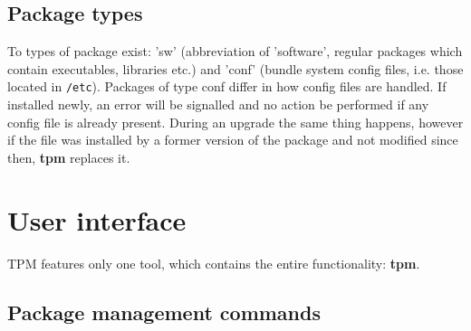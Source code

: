 \documentclass[a4paper]{article}
\newcommand{\file}[1]{\texttt{#1}}
\newcommand{\program}[1]{\textbf{#1}}
\begin{document}
	\subsection{Package types}
	\label{sec:package_types}
	
	To types of package exist: 'sw' (abbreviation of 'software', regular packages which contain executables, libraries etc.) and 'conf' (bundle system config files, i.e. those located in \file{/etc}). Packages of type conf differ in how config files are handled. If installed newly, an error will be signalled and no action be performed if any config file is already present. During an upgrade the same thing happens, however if the file was installed by a former version of the package and not modified since then, \program{tpm} replaces it.
	
	\section{User interface}
	\label{sec:user_interface}
	
	TPM features only one tool, which contains the entire functionality: \program{tpm}.
	
	\subsection{Package management commands}
	\label{sec:package_management_commands}
	
\end{document}
